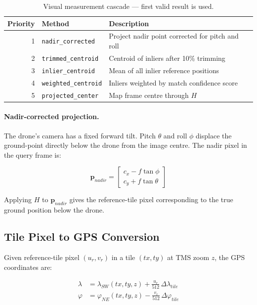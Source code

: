 \documentclass[12pt,a4paper]{article}
\begin{document}
\begin{table}[H]
\centering
\begin{tabular}{@{}rll@{}}
\toprule
\textbf{Priority} & \textbf{Method} & \textbf{Description} \\
\midrule
1 & \texttt{nadir\_corrected} & Project nadir point corrected for pitch and roll \\
2 & \texttt{trimmed\_centroid} & Centroid of inliers after 10\% trimming \\
3 & \texttt{inlier\_centroid} & Mean of all inlier reference positions \\
4 & \texttt{weighted\_centroid} & Inliers weighted by match confidence score \\
5 & \texttt{projected\_center} & Map frame centre through $H$ \\
\bottomrule
\end{tabular}
\caption{Visual measurement cascade --- first valid result is used.}
\end{table}

\paragraph{Nadir-corrected projection.}
The drone's camera has a fixed forward tilt. Pitch $\theta$ and roll $\phi$
displace the ground-point directly below the drone from the image centre.
The nadir pixel in the query frame is:

\begin{equation}
    \mathbf{p}_{nadir} =
    \begin{bmatrix} c_x - f\tan\phi \\ c_y + f\tan\theta \end{bmatrix}
    \label{eq:nadir}
\end{equation}

Applying $H$ to $\mathbf{p}_{nadir}$ gives the reference-tile pixel
corresponding to the true ground position below the drone.

\subsection{Tile Pixel to GPS Conversion}

Given reference-tile pixel $(u_r, v_r)$ in a tile $(tx, ty)$ at TMS zoom
$z$, the GPS coordinates are:

\begin{align}
    \lambda &= \lambda_{SW}(tx,ty,z) + \frac{u_r}{512}\,\Delta\lambda_{tile}
    \label{eq:pix2lon} \\
    \varphi &= \varphi_{NE}(tx,ty,z) - \frac{v_r}{512}\,\Delta\varphi_{tile}
    \label{eq:pix2lat}
\end{align}
\end{document}
